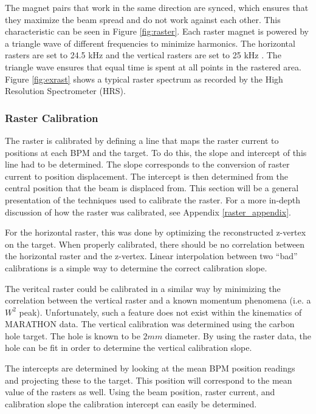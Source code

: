 The magnet pairs that work in the same direction are synced, which ensures that they maximize the beam spread and do not work against each other. This characteristic can be seen in Figure \ref{fig:raster}. Each raster magnet is powered by a triangle wave of different frequencies to minimize harmonics. The horizontal rasters are set to 24.5 kHz and the vertical rasters are set to 25 kHz \cite{rast_current}. The triangle wave ensures that equal time is spent at all points in the rastered area. Figure \ref{fig:exrast} shows a typical raster spectrum as recorded by the High Resolution Spectrometer (HRS).

\subsubsection{Raster Calibration}

The raster is calibrated by defining a line that maps the raster current to positions at each BPM and the target. To do this, the slope and intercept of this line had to be determined. The slope corresponds to the conversion of raster current to position displacement. The intercept is then determined from the central position that the beam is displaced from. This section will be a general presentation of the techniques used to calibrate the raster. For a more in-depth discussion of how the raster was calibrated, see Appendix \ref{raster_appendix}.

For the horizontal raster, this was done by optimizing the reconstructed z-vertex on the target. When properly calibrated, there should be no correlation between the horizontal raster and the z-vertex. Linear interpolation between two ``bad'' calibrations is a simple way to determine the correct calibration slope.

The veritcal raster could be calibrated in a similar way by minimizing the correlation between the vertical raster and a known momentum phenomena (i.e. a $W^2$ peak). Unfortunately, such a feature does not exist within the kinematics of MARATHON data. The vertical calibration was determined using the carbon hole target. The hole is known to be $2mm$ diameter. By using the raster data, the hole can be fit in order to determine the vertical calibration slope.

The intercepts are determined by looking at the mean BPM position readings and projecting these to the target. This position will correspond to the mean value of the rasters as well. Using the beam position, raster current, and calibration slope the calibration intercept can easily be determined.


